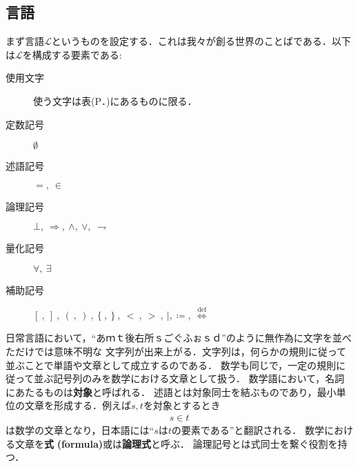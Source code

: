 	\begin{comment}
	\begin{quote}
		初めに言(ことば)があった。言は神と共にあった。言は神であった。\\
		この言は、初めに神と共にあった。\\
		万物は言によって成った。成ったもので、言によらずに成ったものは何一つなかった。
	\end{quote}
	ヨハネによる福音書の冒頭である．数学の世界もまたことばが支配する．
	ただし数学の世界におけることばには二つの階層がある．一つは記号や記号の並べ方を規定する下位のことばであり，
	もう一つは何が定理であるかを規定する上位のことばである．
	前者は我々が神の視点で創る世界のことばであり，後者は神である我々の世界のことばであるが，
	後者は論理と言い換える方が適当である．
	我々が創る世界は集合論と呼ばれ，数や関数など高校まで初等的に与えられてきたあらゆる概念がその世界の中で説明し直されることになる．
	\end{comment}
	
\subsection{言語}
	
	まず言語$\mathcal{L}$というものを設定する．これは我々が創る世界のことばである．以下は$\mathcal{L}$を構成する要素である:
	\begin{description}
		\item[使用文字] 使う文字は表(P．\pageref{tab:alphabet})にあるものに限る．
		\item[定数記号] $\emptyset$
		\item[述語記号] $=,\ \in$
		\item[論理記号] $\bot,\ \Longrightarrow,\ \wedge,\ \vee,\ \rightharpoondown$
		\item[量化記号] $\forall,\ \exists$
		\item[補助記号] $[\ ,\ ]\ ,\ (\ ,\ )\ ,\ \{\ ,\ \}\ ,\ <\ ,\ >\ ,\ |,\coloneqq,\ \overset{\mathrm{def}}{\Longleftrightarrow}$
	\end{description}
	
	日常言語において，``あｍｔ後右所ｓごぐふぉｓｄ''のように無作為に文字を並べただけでは意味不明な
	文字列が出来上がる．文字列は，何らかの規則に従って並ぶことで単語や文章として成立するのである．
	数学も同じで，一定の規則に従って並ぶ記号列のみを数学における文章として扱う．
	数学語において，名詞にあたるものは{\bf 対象}と呼ばれる．
	述語とは対象同士を結ぶものであり，最小単位の文章を形成する．例えば$s,t$を対象とするとき
	\begin{align}
		s \in t
	\end{align}
	は数学の文章となり，日本語には``$s$は$t$の要素である''と翻訳される．
	数学における文章を{\bf 式}
	{\bf (formula)}或は{\bf 論理式}と呼ぶ．
	論理記号とは式同士を繋ぐ役割を持つ．
	
